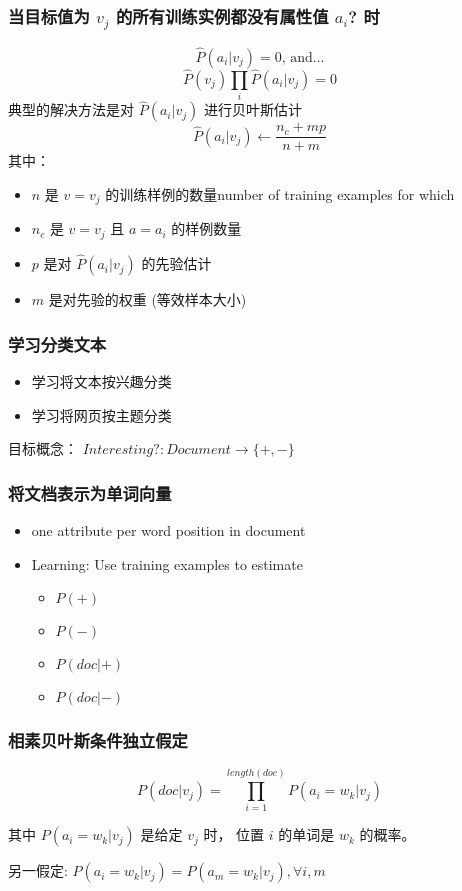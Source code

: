 \documentclass{beamer}
\begin{document}
\begin{frame}
\frametitle{当目标值为 $v_j$ 的所有训练实例都没有属性值 $a_i$? 时}
\label{sec-7-6}

    $$\hat{P}(a_i|v_j) = 0 \mbox{, and...}$$
    $$\hat{P}(v_{j}) \prod_{i} \hat{P}(a_{i} | v_{j}) = 0$$
    典型的解决方法是对 $\hat{P}(a_{i} | v_{j})$ 进行贝叶斯估计
       $$\hat{P}(a_{i} | v_{j}) \leftarrow \frac{n_{c} + mp}{n + m}$$
    其中：
\begin{itemize}
\item $n$ 是 $v=v_j$ 的训练样例的数量number of training examples for which
\item $n_c$ 是 $v=v_j$ 且 $a=a_i$ 的样例数量
\item $p$ 是对 $\hat{P}(a_{i} | v_{j})$ 的先验估计
\item $m$ 是对先验的权重 (等效样本大小)
\end{itemize}
\end{frame}
\begin{frame}
\frametitle{学习分类文本}
\label{sec-7-7}

\begin{itemize}
\item 学习将文本按兴趣分类
\item 学习将网页按主题分类
\end{itemize}


目标概念： $Interesting? : Document \rightarrow \{+,-\}$
\end{frame}
\begin{frame}
\frametitle{将文档表示为单词向量}
\label{sec-7-8}

\begin{itemize}
\item one attribute per word position in document
\item Learning: Use training examples to estimate
\begin{itemize}
\item $P(+)$
\item $P(-)$
\item $P(doc|+)$
\item $P(doc|-)$
\end{itemize}
\end{itemize}
\end{frame}
\begin{frame}
\frametitle{相素贝叶斯条件独立假定}
\label{sec-7-9}


$$P(doc|v_j) = \prod_{i=1}^{length(doc)} P(a_i=w_k | v_j)$$

其中 $P(a_i=w_k| v_j)$ 是给定 $v_j$ 时， 位置 $i$ 的单词是 $w_k$ 的概率。

另一假定: $P(a_i=w_k|v_j) = P(a_m=w_k|v_j), \forall i,m$
\end{frame}
\end{document}
